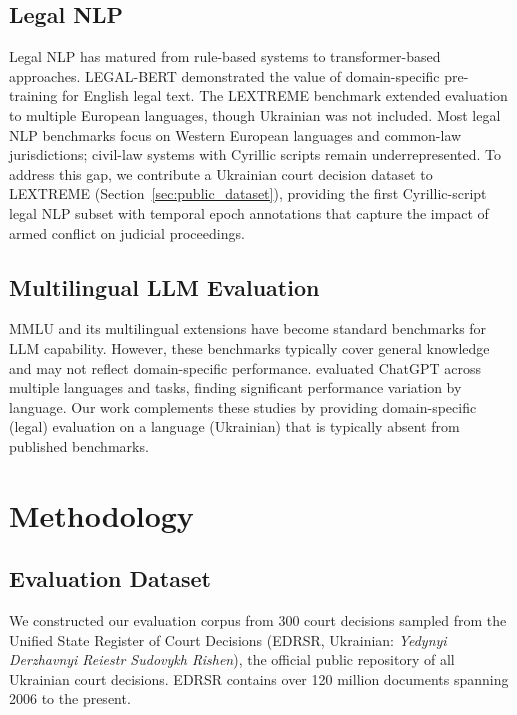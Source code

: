 \documentclass[11pt,a4paper]{article}
\begin{document}
\subsection{Legal NLP}

Legal NLP has matured from rule-based systems to transformer-based approaches. LEGAL-BERT \citep{chalkidis2020legal} demonstrated the value of domain-specific pre-training for English legal text. The LEXTREME benchmark \citep{niklaus2023lextreme} extended evaluation to multiple European languages, though Ukrainian was not included. Most legal NLP benchmarks focus on Western European languages and common-law jurisdictions; civil-law systems with Cyrillic scripts remain underrepresented. To address this gap, we contribute a Ukrainian court decision dataset to LEXTREME (Section~\ref{sec:public_dataset}), providing the first Cyrillic-script legal NLP subset with temporal epoch annotations that capture the impact of armed conflict on judicial proceedings.

\subsection{Multilingual LLM Evaluation}

MMLU \citep{hendrycks2021measuring} and its multilingual extensions have become standard benchmarks for LLM capability. However, these benchmarks typically cover general knowledge and may not reflect domain-specific performance. \citet{lai2023chatgpt} evaluated ChatGPT across multiple languages and tasks, finding significant performance variation by language. Our work complements these studies by providing domain-specific (legal) evaluation on a language (Ukrainian) that is typically absent from published benchmarks.

\section{Methodology}

\subsection{Evaluation Dataset}
\label{sec:dataset}

We constructed our evaluation corpus from 300 court decisions sampled from the Unified State Register of Court Decisions (EDRSR, Ukrainian: \textit{Yedynyi Derzhavnyi Reiestr Sudovykh Rishen}), the official public repository of all Ukrainian court decisions. EDRSR contains over 120 million documents spanning 2006 to the present.
\end{document}
